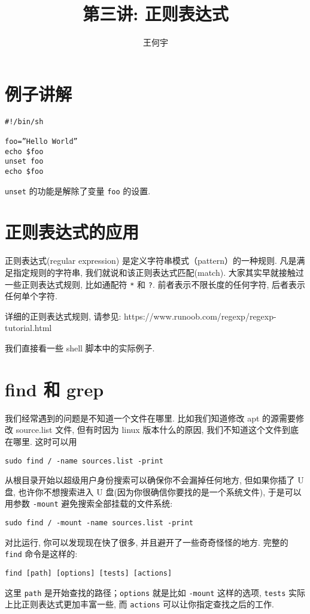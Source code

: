 \documentclass[a4paper]{ctexart}
\title{第三讲: 正则表达式}
\author{王何宇}
\date{}
\begin{document}
\maketitle
\pagestyle{empty}

\section{例子讲解}

\begin{verbatim}
#!/bin/sh

foo=”Hello World”
echo $foo
unset foo
echo $foo
\end{verbatim}

\verb|unset| 的功能是解除了变量 \verb|foo| 的设置.



\section{正则表达式的应用}

正则表达式(regular expression) 是定义字符串模式（pattern）的一种规则.
凡是满足指定规则的字符串, 我们就说和该正则表达式匹配(match). 
大家其实早就接触过一些正则表达式规则, 比如通配符 \verb|*| 和 \verb|?|.
前者表示不限长度的任何字符, 后者表示任何单个字符.

详细的正则表达式规则, 请参见: \newline
https://www.runoob.com/regexp/regexp-tutorial.html

我们直接看一些 shell 脚本中的实际例子. 

\section{find 和 grep}

我们经常遇到的问题是不知道一个文件在哪里. 比如我们知道修改 apt 的源需要修改 source.list 文件,
但有时因为 linux 版本什么的原因, 我们不知道这个文件到底在哪里. 这时可以用
\begin{verbatim}
sudo find / -name sources.list -print
\end{verbatim}
从根目录开始以超级用户身份搜索可以确保你不会漏掉任何地方,
但如果你插了 U 盘, 也许你不想搜索进入 U 盘(因为你很确信你要找的是一个系统文件), 于是可以用参数
\verb|-mount| 避免搜索全部挂载的文件系统:
\begin{verbatim}
sudo find / -mount -name sources.list -print
\end{verbatim}
对比运行, 你可以发现现在快了很多, 并且避开了一些奇奇怪怪的地方.
完整的 \verb|find| 命令是这样的:
\begin{verbatim}
find [path] [options] [tests] [actions]
\end{verbatim}
这里 \verb|path| 是开始查找的路径；\verb|options| 就是比如 \verb|-mount|
这样的选项, \verb|tests| 实际上比正则表达式更加丰富一些, 而 \verb|actions|
可以让你指定查找之后的工作.
\end{document}
